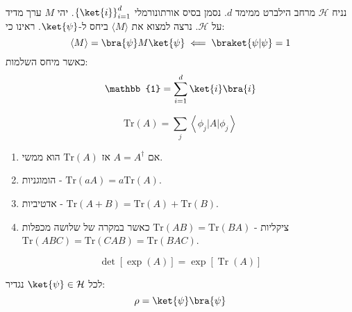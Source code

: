 \documentclass{tstextbook}
\begin{document}
\begin{definition}
נניח \(\mathcal{H}\) מרחב הילברט ממימד \(d\). נסמן בסיס אורתונורמלי \(\left\{  \ket{i}  \right\}_{i=1}^{d}\). יהי \(M\) ערך מדיד על \(\mathcal{H}\). נרצה למצוא את \(\langle M \rangle\) ביחס ל-\(\ket{\psi}\).
ראינו כי:
$$\langle M \rangle =\bra{\psi} M \ket{\psi} \impliedby \braket{ \psi | \psi } =1$$
כאשר מיחס השלמות:
$$\mathbb{1} =\sum_{i=1}^{d} \ket{i} \bra{i} $$

\end{definition}
\begin{definition}
$$\mathrm{Tr}(A)=\sum_{j}\left\langle\phi_{j}|A|\phi_{j}\right\rangle$$

\end{definition}
\begin{proposition}
  \begin{enumerate}
    \item אם \(A=A^{\dagger}\) אז \(\mathrm{Tr}(A)\) הוא ממשי. 


    \item הומוגניות - \(\mathrm{Tr}(aA)=a\mathrm{Tr}(A)\). 


    \item אדטיביות - \(\mathrm{Tr}(A+B)=\mathrm{Tr}(A)+\mathrm{Tr}(B)\). 


    \item ציקליות - \(\mathrm{Tr}(AB)=\mathrm{Tr}(BA)\) כאשר במקרה של שלושה מכפלות \(\mathrm{Tr}(ABC)=\mathrm{Tr}(CAB)=\mathrm{Tr}(BAC)\). 


  \end{enumerate}
\end{proposition}
\begin{proposition}
$$\operatorname*{det}[\exp(A)]=\exp[\operatorname{Tr}(A)]$$

\end{proposition}
\begin{definition}
לכל \(\ket{\psi}\in \mathcal{H}\) נגדיר:
$$\rho=\ket{\psi}\bra{\psi}   $$

\end{definition}
\end{document}
